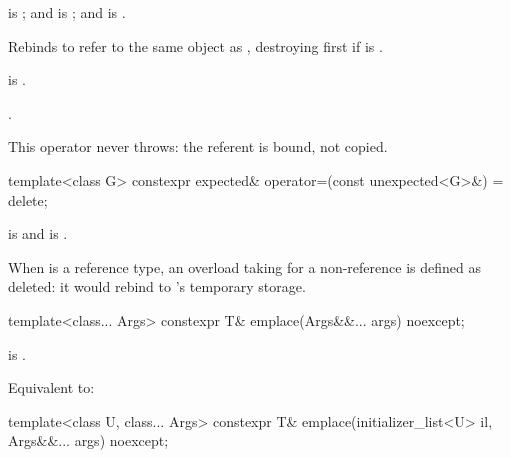 \begin{itemdescr}
\pnum
\constraints
{} is ; and  is ; and  is .

\pnum
\effects
Rebinds  to refer to the same object as , destroying  first if  is .

\pnum
\ensures
{} is .

\pnum
\returns
{}.

\pnum
\remarks
This operator never throws: the referent is bound, not copied.
\end{itemdescr}

%
\begin{itemdecl}
template<class G>
  constexpr expected& operator=(const unexpected<G>&) = delete;
\end{itemdecl}

\begin{itemdescr}
\pnum
\constraints
{} is  and  is .

\pnum
\remarks
When  is a reference type, an overload taking  for a non-reference  is defined as deleted: it would rebind  to 's temporary storage.
\end{itemdescr}

%
\begin{itemdecl}
template<class... Args>
  constexpr T& emplace(Args&&... args) noexcept;
\end{itemdecl}

\begin{itemdescr}
\pnum
\constraints
{} is .

\pnum
\effects
Equivalent to: 
\end{itemdescr}

%
\begin{itemdecl}
template<class U, class... Args>
  constexpr T& emplace(initializer_list<U> il, Args&&... args) noexcept;
\end{itemdecl}


